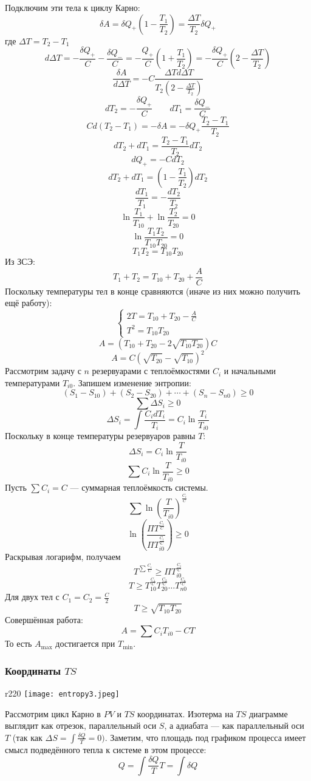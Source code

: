 \documentclass[12pt, a4paper]{article}%
\begin{document}
Подключим эти тела к циклу Карно:
\[\delta A=\delta Q_+\left(1-\frac{T_1}{T_2}\right)=\frac{\Delta T}{T_2}\delta Q_+\]где $\Delta T=T_2-T_1$
\[d\Delta T=-\frac{\delta Q_+}{C}-\frac{\delta Q_-}{C}=-\frac{Q_+}{C}\left(1+\frac{T_1}{T_2}\right)=-\frac{\delta Q_+}{C}\left(2-\frac{\Delta T}{T_2}\right)
\]\[\frac{\delta A}{d\Delta T}=-C\frac{\Delta Td\Delta T}{T_2\left(2-\frac{\Delta T}{T_2}\right)}\]\[
dT_2=-\frac{\delta Q_+}{C}\qquad dT_1=\frac{\delta Q_-}{C}\]\[
Cd(T_2-T_1)=-\delta A=-\delta Q_+\frac{T_2-T_1}{T_2}\]\[
dT_2+dT_1=\frac{T_2-T_1}{T_2}dT_2\]\[
dQ_+=-CdT_2\]\[
dT_2+dT_1=\left(1-\frac{T_1}{T_2}\right)dT_2\]\[
\frac{dT_1}{T_1}=-\frac{dT_2}{T_2}\]\[
\ln\frac{T_1}{T_{10}}+\ln\frac{T_2}{T_{20}}=0\]\[
\ln\frac{T_1T_2}{T_{10}T_{20}}=0\]\[
T_1T_2=T_{10}T_{20}\]Из ЗСЭ:
\[T_1+T_2=T_{10}+T_{20}+\frac{A}{C}\]Поскольку температуры тел в конце сравняются (иначе из них можно получить ещё работу):
\[\begin{cases}2T=T_{10}+T_{20}-\frac AC\\
T^2=T_{10}T_{20}\end{cases}\]\[
A=\left(T_{10}+T_{20}-2\sqrt{T_{10}T_{20}}\right)C\]\[
A=C\left(\sqrt{T_{20}}-\sqrt{T_{10}}\right)^2\]
Рассмотрим задачу с $n$ резервуарами с теплоёмкостями $C_i$ и начальными температурами $T_{i0}$. Запишем изменение энтропии:
\[(S_1-S_{10})+(S_2-S_{20})+\cdots+(S_n-S_{n0})\ge0\]\[
\sum\Delta S_i\ge0\]\[
\Delta S_i=\int\frac{C_idT_i}{T_i}=C_i\ln\frac{T_i}{T_{i0}}\]Поскольку в конце температуры резервуаров равны $T$:
\[\Delta S_i=C_i\ln\frac{T}{T_{i0}}\]\[
\sum C_i\ln\frac{T}{T_{i0}}\ge0\]Пусть $\sum C_i=C$ --- суммарная теплоёмкость системы.
\[\sum\ln\left(\frac{T}{T_{i0}}\right)^{\frac{C_i}{C}}\]\[
\ln\left(\frac{\Pi T^{\frac{C_i}{C}}}{\Pi T_{i0}^{\frac{C_i}{C}}}\right)\ge0\]Раскрывая логарифм, получаем
\[T^{\sum\frac{C_i}{C}}\ge\Pi T_{i0}^{\frac{C_i}{C}}\]\[
T\ge T^{\frac{C_1}{C}}_{10}T^{\frac{C_2}{C}}_{20}\dots T^{\frac{C_n}{C}}_{n0}\]Для двух тел с $C_1=C_2=\frac C2$
\[T\ge\sqrt{T_{10}T_{20}}\]Совершённая работа:
\[A=\sum C_iT_{i0}-CT\]
То есть $A_{\text{max}}$ достигается при $T_{\text{min}}$.


\subsubsection*{Координаты $TS$}

\begin{wrapfigure}[8]{r}{220}
\texttt{[image: entropy3.jpeg]}
\centering
\end{wrapfigure}

Рассмотрим цикл Карно в $PV$ и $TS$ координатах.
Изотерма на $TS$ диаграмме выглядит как отрезок,  параллельный оси $S$, а адиабата --- как параллельный оси $T$ (так как $\Delta S=\int\frac{\delta Q}{T}=0)$.
Заметим, что площадь под графиком процесса имеет смысл подведённого тепла к системе в этом процессе:
\[Q=\int\frac{\delta Q}{T}T=\int\delta Q\]
\end{document}
